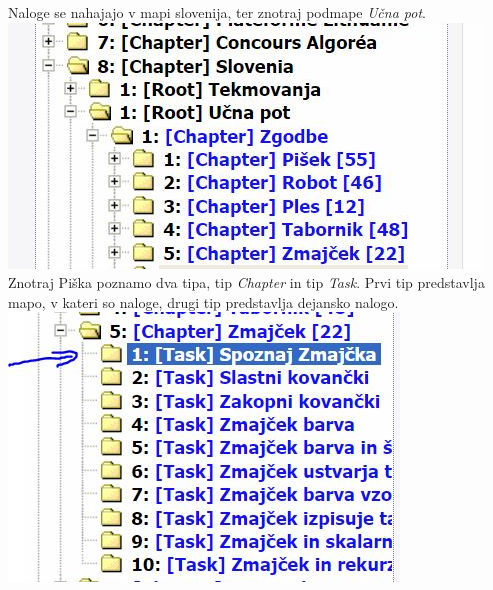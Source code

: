 \documentclass[11pt]{article} %
\begin{document}
Naloge se nahajajo v mapi slovenija, ter znotraj podmape \textit{Učna pot}. \\
\includegraphics[scale=0.8]{admin_drevo_odprto}\\

\pagebreak
Znotraj Piška poznamo dva tipa, tip \textit{Chapter} in tip \textit{Task}. Prvi tip predstavlja mapo, v kateri so naloge, drugi tip predstavlja dejansko nalogo.\\
\includegraphics[scale=0.7]{zmajcek_task}
\end{document}
